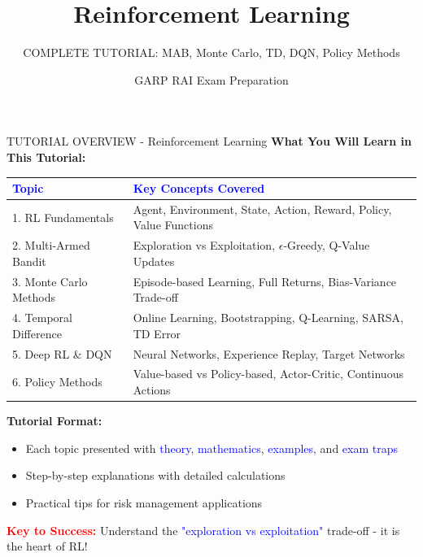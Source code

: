 \documentclass[8pt]{beamer}
\title{Reinforcement Learning}
\subtitle{COMPLETE TUTORIAL: MAB, Monte Carlo, TD, DQN, Policy Methods}
\author{GARP RAI Exam Preparation}
\date{}
\begin{document}
	
	\begin{frame}
		\titlepage
	\end{frame}
	
	
	\begin{frame}{TUTORIAL OVERVIEW - Reinforcement Learning}
		\fontsize{7}{8}\selectfont
		\textbf{What You Will Learn in This Tutorial:}
		
		\vspace{0.2cm}
		\begin{tabular}{|p{2.5cm}|p{5.5cm}|}
			\hline
			\textcolor{blue}{Topic} & \textcolor{blue}{Key Concepts Covered} \\
			\hline
			1. RL Fundamentals & Agent, Environment, State, Action, Reward, Policy, Value Functions \\
			\hline
			2. Multi-Armed Bandit & Exploration vs Exploitation, $\epsilon$-Greedy, Q-Value Updates \\
			\hline
			3. Monte Carlo Methods & Episode-based Learning, Full Returns, Bias-Variance Trade-off \\
			\hline
			4. Temporal Difference & Online Learning, Bootstrapping, Q-Learning, SARSA, TD Error \\
			\hline
			5. Deep RL \& DQN & Neural Networks, Experience Replay, Target Networks \\
			\hline
			6. Policy Methods & Value-based vs Policy-based, Actor-Critic, Continuous Actions \\
			\hline
		\end{tabular}
		
		\vspace{0.2cm}
		\textbf{Tutorial Format:}
		\begin{itemize}
			\item Each topic presented with \textcolor{blue}{theory}, \textcolor{blue}{mathematics}, \textcolor{blue}{examples}, and \textcolor{blue}{exam traps}
			\item Step-by-step explanations with detailed calculations
			\item Practical tips for risk management applications
		\end{itemize}
		
		\textcolor{red}{\textbf{Key to Success:}} Understand the \textcolor{blue}{"exploration vs exploitation"} trade-off - it is the heart of RL!
	\end{frame}
	
\end{document}
